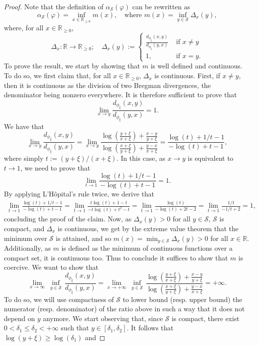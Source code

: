 \documentclass[10pt,a4paper]{amsart}
\newcommand{\R}{\mathbb R}
\def\cS{{\mathcal{S}}}
\begin{document}
\begin{proof}
Note that the definition of $\alpha_{\mathcal{S}}(\varphi)$ can be rewritten as
$$
\alpha_{\mathcal{S}}(\varphi)=\inf_{x\in\R_{\geq 0}} m(x), \quad \text{where } m(x)=\inf_{y\in \cS} \Delta_x(y),
$$
where, for all $x\in\R_{\geq 0}$,
$$
\Delta_x\colon \R\to \R_{\geq 0}; \quad \Delta_x(y):=
\begin{cases}
\frac{d_{\phi_\xi}(x, y)}{d_{\phi_\xi}(y, x)} & \text{ if } x\neq y\\
1, & \text{ if } x=y.
\end{cases}
$$
To prove the result, we start by showing that $m$ is well defined and continuous. To do so, we first claim that, for all $x\in \R_{\geq 0}$, $\Delta_x$ is continuous. First, if $x\neq y$, then it is continuous as the division of two Bregman divergences, the denominator being nonzero everywhere. It is therefore sufficient to prove that 
$$
\lim_{x\to y}\frac{d_{\phi_\xi}(x, y)}{d_{\phi_\xi}(y, x)}=1.
$$
We have that
$$
\lim_{x\to y}\frac{d_{\phi_\xi}(x, y)}{d_{\phi_\xi}(y, x)}=\lim_{x\to y}\frac{\log(\frac{y+\xi}{x+\xi})+\frac{x-y}{y+\xi}}{ \log(\frac{x+\xi}{y+\xi})+\frac{y-x}{x+\xi}}=\frac{\log(t)+1/t-1}{-\log(t)+t-1},
$$
where simply $t:=(y+\xi)/(x+\xi)$. In this case, as $x\to y$ is equivalent to $t\to 1$, we need to prove that
$$
\lim_{t\to 1}\frac{\log(t)+1/t-1}{-\log(t)+t-1}=1.
$$
By applying L'H\^opital's rule twice, we derive that
$$
\begin{aligned}
\lim_{t\to 1} \frac{\log(t)+1/t-1}{-\log(t)+t-1}=\lim_{t\to 1}\frac{t\log(t)+1-t}{-t\log(t)+t^2-t}= \lim_{t\to 1} \frac{\log(t)}{-\log(t)+2t-2}=\lim_{t\to 1} \frac{1/t}{-1/t+2}=1,
\end{aligned}
$$
concluding the proof of the claim. Now, as $\Delta_x(y)>0$ for all $y\in\cS$, $\cS$ is compact, and $\Delta_x$ is continuous, we get by the extreme value theorem that the minimum over $\mathcal{S}$ is attained, and so $m(x)=\min_{y\in \cS} \Delta_x(y)>0$ for all $x\in \R$. Additionally, as $m$ is defined as the minimum of continuous functions over a compact set, it is continuous too. Thus to conclude it suffices to show that $m$ is coercive. We want to show that 
$$
    \lim_{x\to\infty} \ \underset{y \in \cS}{\inf}\, \frac{d_{\phi_\xi}(x,y)}{d_{\phi_\xi}(y,x)} = \underset{x \to + \infty}{\lim} \ \underset{y \in \cS}{\inf} \, \frac{\log(\frac{y+\xi}{x+\xi})+\frac{x-y}{y+\xi}}{ \log(\frac{x+\xi}{y+\xi})+\frac{y-x}{x+\xi}}=+\infty.
$$
To do so, we will use compactness of $\mathcal{S}$ to lower bound (resp. upper bound) the numerator (resp. denominator) of the ratio above in such a way that it does not depend on $y$ anymore. We start observing that, since $\mathcal{S}$ is compact, there exist $0<\delta_1\leq\delta_2<+\infty$ such that $y\in[\delta_1,\delta_2]$. It follows that $\log(y+\xi)\geq \log(\delta_1)$ and

\end{proof}
\end{document}
